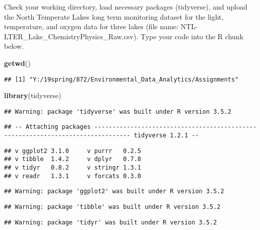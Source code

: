 \documentclass[]{article}
\newenvironment{Shaded}{\begin{snugshade}}{\end{snugshade}}
\newcommand{\KeywordTok}[1]{\textcolor[rgb]{0.13,0.29,0.53}{\textbf{#1}}}
\newcommand{\NormalTok}[1]{#1}
\begin{document}
Check your working directory, load necessary packages (tidyverse), and
upload the North Temperate Lakes long term monitoring dataset for the
light, temperature, and oxygen data for three lakes (file name:
NTL-LTER\_Lake\_ChemistryPhysics\_Raw.csv). Type your code into the R
chunk below.

\begin{Shaded}
\begin{Highlighting}[]
\KeywordTok{getwd}\NormalTok{()}
\end{Highlighting}
\end{Shaded}

\begin{verbatim}
## [1] "Y:/19spring/872/Environmental_Data_Analytics/Assignments"
\end{verbatim}

\begin{Shaded}
\begin{Highlighting}[]
\KeywordTok{library}\NormalTok{(tidyverse)}
\end{Highlighting}
\end{Shaded}

\begin{verbatim}
## Warning: package 'tidyverse' was built under R version 3.5.2
\end{verbatim}

\begin{verbatim}
## -- Attaching packages -------------------------------------------------------------------------------- tidyverse 1.2.1 --
\end{verbatim}

\begin{verbatim}
## v ggplot2 3.1.0     v purrr   0.2.5
## v tibble  1.4.2     v dplyr   0.7.8
## v tidyr   0.8.2     v stringr 1.3.1
## v readr   1.3.1     v forcats 0.3.0
\end{verbatim}

\begin{verbatim}
## Warning: package 'ggplot2' was built under R version 3.5.2
\end{verbatim}

\begin{verbatim}
## Warning: package 'tibble' was built under R version 3.5.2
\end{verbatim}

\begin{verbatim}
## Warning: package 'tidyr' was built under R version 3.5.2
\end{verbatim}
\end{document}
